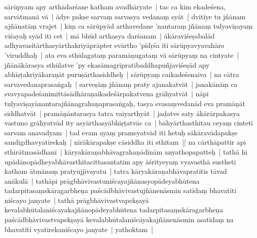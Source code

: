 \documentclass[article,12pt,a4paper]{memoir}
\begin{document}
sārūpyam apy arthādarśane katham avadhāryate | tac ca kim ekadeśena, sarvātmanā vā | ādye pakṣe sarvaṃ sarvasya vedanaṃ syāt | dvitīye tu jñānam ajñānatāṃ vrajet | kiṃ ca sārūpyād arthavedane 'nantaraṃ jñānaṃ tulyaviṣayaṃ viśayaḥ syād iti cet | \label{thakur75-125.4} mā bhūd arthasya darśanam | ākāraviśeṣabalād adhyavasitārthasyārthakriyāprāpter evārtho 'pīdṛśa iti sārūpyavyavahāro 'viruddhaḥ | ata eva sthūlagataṃ paramāṇugataṃ vā sārūpyaṃ na cintyate | jñānākārasya sthūlatve 'py ekasāmagrīpratibaddhapuñjaviśeṣād apy abhīṣṭakriyākaraṇāt puruṣārthasiddheḥ | \label{thakur75-125.7} sārūpyaṃ caikadeśenaiva | na cātra sarvavedanaprasaṅgaḥ | sarveṣāṃ jñānaṃ praty ajanakatvāt | janakānāṃ ca svavyapadeśanimittāsādhāraṇaikadeśārpakatvena grāhyatvāt | \label{thakur75-125.9} nāpi tulyaviṣayānantarajñānagrahaṇaprasaṅgaḥ, tasya svasaṃvedanād eva pramāṇāt siddhatvāt | pramāṇāntarasya tatra vaiyarthyāt | jaḍatve saty ākārārpakasya vastuno grāhyatvād ity asyārthasyābhīṣṭatvāc ca | bāhyārthasthitau ceyaṃ cinteti sarvam anavadyam | \label{thakur75-125.12} tad evam ayaṃ prameyatvād iti hetuḥ sākāravādapakṣe sandigdhavyatirekaḥ | nirākārapakṣe cāsiddha iti sthitam || \label{thakur75-125.14} na cārthāpattir api sthirātmasādhanī | kāryakāraṇabhāvagrahaṇādīnām anyathopapatteḥ | \label{thakur75-125.15} tathā hi upādānopādheyabhāvasthitacittasantatim apy āśrityeyaṃ vyavasthā sustheti katham ātmānaṃ pratyujjīvayatu | tatra kāryakāraṇabhāvapratītis tāvad anākulā | tathāpi prāgbhāvivastuniścayajñānasyopādeyabhūtena tadarpitasaṃskāragarbheṇa paścādbhāvivastujñānenāsmin satīdaṃ bhavatīti niścayo janyate | tathā prāgbhāvivastvapekṣayā kevalabhūtalaniścayakajñānopādeyabhūtena tadarpitasaṃskāragarbheṇa paścādbhāvivastvapekṣayā kevalabhūtalaniścāyakajñānenāsmin asatīdaṃ na bhavatīti vyatirekaniścayo janyate | yathoktam |
	\pend
      
\end{document}
